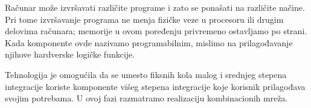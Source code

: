 Računar može izvršavati različite programe i zato se ponašati na različite načine. Pri tome izvršavanje programa ne menja fizičke veze u procesoru ili drugim delovima računara; memorije u ovom poređenju privremeno ostavljamo po strani. Kada komponente ovde nazivamo programabilnim, mislimo na prilagođavanje njihove hardverske logičke funkcije.

Tehnologija je omogućila da se umesto fiksnih kola malog i srednjeg stepena integracije koriste komponente višeg stepena integracije koje korisnik prilagođava svojim potrebama. U ovoj fazi razmatramo realizaciju kombinacionih mreža.
